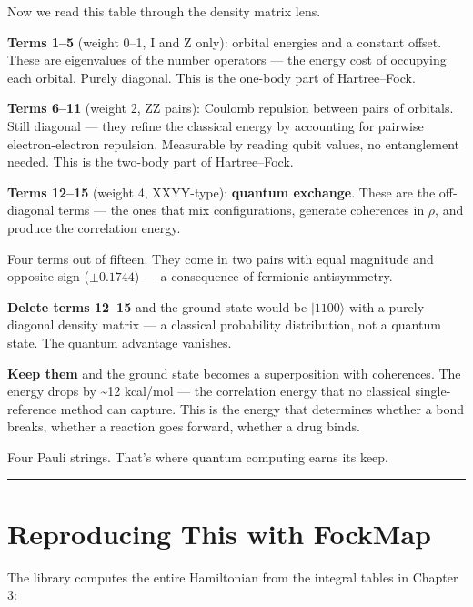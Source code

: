 \documentclass[
  11pt,
  oneside]{book}
\begin{document}
Now we read this table through the density matrix lens.

\textbf{Terms 1--5} (weight 0--1, I and Z only): orbital energies and a
constant offset. These are eigenvalues of the number operators --- the
energy cost of occupying each orbital. Purely diagonal. This is the
one-body part of Hartree--Fock.

\textbf{Terms 6--11} (weight 2, ZZ pairs): Coulomb repulsion between
pairs of orbitals. Still diagonal --- they refine the classical energy
by accounting for pairwise electron-electron repulsion. Measurable by
reading qubit values, no entanglement needed. This is the two-body part
of Hartree--Fock.

\textbf{Terms 12--15} (weight 4, XXYY-type): \textbf{quantum exchange}.
These are the off-diagonal terms --- the ones that mix configurations,
generate coherences in \(\rho\), and produce the correlation energy.

Four terms out of fifteen. They come in two pairs with equal magnitude
and opposite sign (\(\pm 0.1744\)) --- a consequence of fermionic
antisymmetry.

\textbf{Delete terms 12--15} and the ground state would be
\(\lvert 1100\rangle\) with a purely diagonal density matrix --- a
classical probability distribution, not a quantum state. The quantum
advantage vanishes.

\textbf{Keep them} and the ground state becomes a superposition with
coherences. The energy drops by \textasciitilde12 kcal/mol --- the
correlation energy that no classical single-reference method can
capture. This is the energy that determines whether a bond breaks,
whether a reaction goes forward, whether a drug binds.

Four Pauli strings. That's where quantum computing earns its keep.

\begin{center}\rule{0.5\linewidth}{0.5pt}\end{center}

\section{Reproducing This with
FockMap}\label{reproducing-this-with-fockmap}

The library computes the entire Hamiltonian from the integral tables in
Chapter 3:
\end{document}
